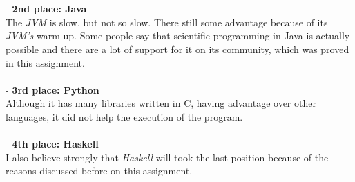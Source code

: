 \documentclass[conference]{IEEEtran}
\begin{document}
\\\\
- \textbf{2nd place: Java}\\
The \textit{JVM} is slow, but not so slow. There still some advantage because of its \textit{JVM's} warm-up. Some people say that scientific programming in Java is actually possible and there are a lot of support for it on its community, which was proved in this assignment.
\\\\
- \textbf{3rd place: Python}\\
Although it has many libraries written in C, having advantage over other languages, it did not help the execution of the program.
\\\\
- \textbf{4th place: Haskell}\\
I also believe strongly that \textit{Haskell} will took the last position because of the reasons discussed before on this assignment.
\end{document}
